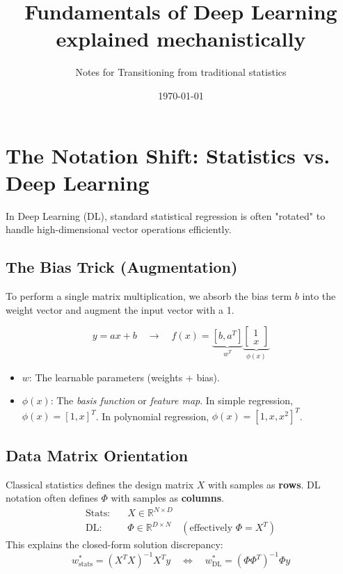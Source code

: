 \documentclass{article}
\title{Fundamentals of Deep Learning explained mechanistically}
\author{Notes for Transitioning from traditional statistics}
\date{\today}
\begin{document}
\maketitle

\section{The Notation Shift: Statistics vs. Deep Learning}
In Deep Learning (DL), standard statistical regression is often "rotated" to handle high-dimensional vector operations efficiently.

\subsection{The Bias Trick (Augmentation)}
To perform a single matrix multiplication, we absorb the bias term $b$ into the weight vector and augment the input vector with a 1.

\begin{equation}
    y = ax + b \quad \longrightarrow \quad f(x) = \underbrace{[b, a^T]}_{w^T} \underbrace{\begin{bmatrix} 1 \\ x \end{bmatrix}}_{\phi(x)}
\end{equation}

\begin{itemize}
    \item \textbf{$w$}: The learnable parameters (weights + bias).
    \item \textbf{$\phi(x)$}: The \textit{basis function} or \textit{feature map}. In simple regression, $\phi(x) = [1, x]^T$. In polynomial regression, $\phi(x) = [1, x, x^2]^T$.
\end{itemize}

\subsection{Data Matrix Orientation}
Classical statistics defines the design matrix $X$ with samples as \textbf{rows}. DL notation often defines $\Phi$ with samples as \textbf{columns}.
\begin{align*}
    \text{Stats:} & \quad X \in \mathbb{R}^{N \times D} \\
    \text{DL:} & \quad \Phi \in \mathbb{R}^{D \times N} \quad (\text{effectively } \Phi = X^T)
\end{align*}
This explains the closed-form solution discrepancy:
\begin{equation}
    w^*_{\text{stats}} = (X^T X)^{-1} X^T y \quad \iff \quad w^*_{\text{DL}} = (\Phi \Phi^T)^{-1} \Phi y
\end{equation}
\end{document}

